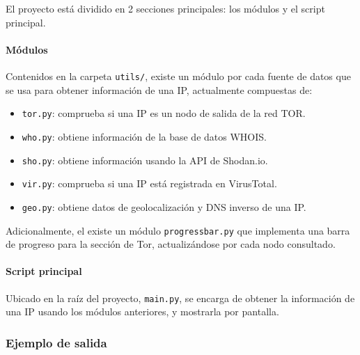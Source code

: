             El proyecto está dividido en 2 secciones principales: los módulos y el script principal.

            \paragraph{Módulos} Contenidos en la carpeta \texttt{utils/}, existe un módulo por cada fuente de datos que se usa para obtener información de una IP, actualmente compuestas de:

                \begin{itemize}
                    \item \texttt{tor.py}: comprueba si una IP es un nodo de salida de la red TOR.
                    \item \texttt{who.py}: obtiene información de la base de datos WHOIS.
                    \item \texttt{sho.py}: obtiene información usando la API de Shodan.io.
                    \item \texttt{vir.py}: comprueba si una IP está registrada en VirusTotal.
                    \item \texttt{geo.py}: obtiene datos de geolocalización y DNS inverso de una IP.
                \end{itemize}

                Adicionalmente, el existe un módulo \texttt{progressbar.py} que implementa una barra de progreso para la sección de Tor, actualizándose por cada nodo consultado.

            \paragraph{Script principal} Ubicado en la raíz del proyecto, \texttt{main.py}, se encarga de obtener la información de una IP usando los módulos anteriores, y mostrarla por pantalla.

            \newpage

            \subsubsection{Ejemplo de salida}

